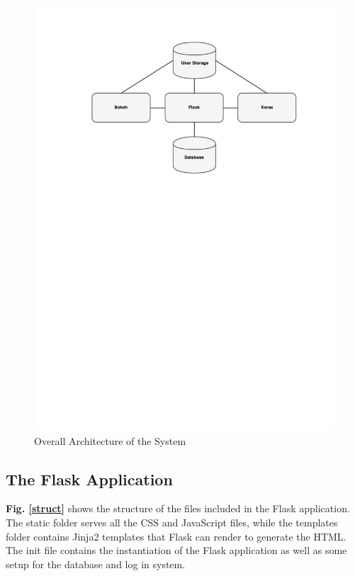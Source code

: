 \begin{figure}[h!]
    \centering
        \includegraphics[width=1\textwidth]{fig/overall-architecture.pdf}
        \caption{Overall Architecture of the System}
        \label{architecture1}
\end{figure}


\subsection{The Flask Application}

\textbf{Fig. \ref{struct}} shows the structure of the files included in the Flask application. The static folder serves all the CSS and JavaScript files, while the templates folder contains Jinja2 templates that Flask can render to generate the HTML. The init file contains the instantiation of the Flask application as well as some setup for the database and log in system.

